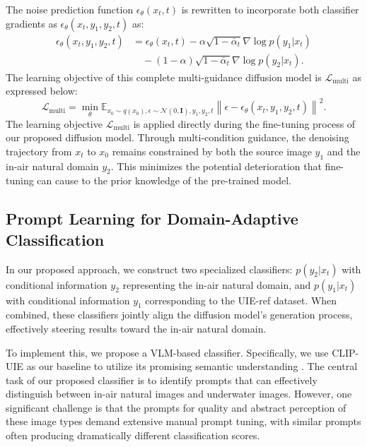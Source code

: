 \documentclass[3p,12pt,authoryear]{elsarticle}
\begin{document}
The noise prediction function  $\epsilon_\theta(x_t, t)$ is rewritten to incorporate both classifier gradients as $\epsilon_\theta(x_t, y_1, y_2, t)$ as:
\begin{equation}
\label{10}
\begin{split}
\epsilon_\theta(x_t, y_1, y_2, t) &= \epsilon_\theta(x_t, t) 
- \alpha \sqrt{1 - \bar{\alpha}_t} \nabla \log p(y_1 | x_t) \\
&\quad - (1 - \alpha) \sqrt{1 - \bar{\alpha}_t} \nabla \log p(y_2 | x_t).
\end{split}
\end{equation}
The learning objective of this complete multi-guidance diffusion model is $\mathcal{L}_{\text{multi}}$ as expressed below:  
\begin{equation}
\label{11}
\mathcal{L}_{\text{multi}} = \min_{\theta} \mathbb{E}_{x_0 \sim q(x_0), \epsilon \sim \mathcal{N}(0, \mathbf{I}), y_1, y_2, t} \left\| \epsilon - \epsilon_\theta(x_t, y_1, y_2, t) \right\|^2.
\end{equation}
The learning objective $\mathcal{L}_{\text{multi}}$ is applied directly during the fine-tuning process of our proposed diffusion model. Through multi-condition guidance, the denoising trajectory from $x_t$ to $x_0$ remains constrained by both the source image $y_1$ and the in-air natural domain $y_2$. This minimizes the potential deterioration that fine-tuning can cause to the prior knowledge
of the pre-trained model.

\subsection{Prompt Learning for Domain-Adaptive Classification}
In our proposed approach, we construct two specialized classifiers: $p(y_2|x_t)$ with conditional information $y_2$ representing the in-air natural domain, and $p(y_1|x_t)$ with conditional information $y_1$ corresponding to the UIE-ref dataset. When combined, these classifiers jointly align the diffusion model's generation process, effectively steering results toward the in-air natural domain.

To implement this, we propose a VLM-based classifier. Specifically, we use CLIP-UIE as our baseline to utilize its promising semantic understanding \cite{pmlr-v139-radford21a}. The central task of our proposed classifier is to identify prompts that can effectively distinguish between in-air natural images and underwater images. However, one significant challenge is that the prompts for quality and abstract perception of these image types demand extensive manual prompt tuning, with similar prompts often producing dramatically different classification scores.
\end{document}
